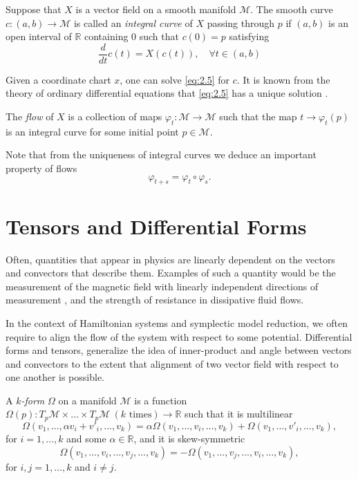 \begin{definition}
Suppose that $X$ is a vector field on a smooth manifold $\mathcal M$. The smooth curve $c:(a,b)\to \mathcal M$ is called an \emph{integral curve} of $X$ passing through $p$ if $(a,b)$ is an open interval of $\mathbb R$ containing $0$ such that  $c(0)=p$ satisfying
\begin{equation} \label{eq:2.5}
	\frac{d}{dt}c(t) = X(c(t)), \quad \forall t\in(a,b) 
\end{equation}
\end{definition}
Given a coordinate chart $x$, one can solve \cref{eq:2.5} for $c$. It is known from the theory of ordinary differential equations that \cref{eq:2.5} has a unique solution \cite{teschl2012ordinary}. 
\begin{definition}
	The \emph{flow} of $X$ is a collection of maps $\varphi_t : \mathcal M \to \mathcal M$ such that the map $t \to \varphi_t(p)$ is an integral curve for some initial point $p\in \mathcal M$.
\end{definition}
Note that from the uniqueness of integral curves we deduce an important property of flows
\begin{equation}
	\varphi_{t+s} = \varphi_t \circ \varphi_s.
\end{equation}

\section{Tensors and Differential Forms}
Often, quantities that appear in physics are linearly dependent on the vectors and convectors that describe them. Examples of such a quantity would be the measurement of the magnetic field with linearly independent directions of measurement \cite{Wald:106274}, and the strength of resistance in dissipative fluid flows. 

In the context of Hamiltonian systems and symplectic model reduction, we often require to align the flow of the system with respect to some potential. Differential forms and tensors, generalize the idea of inner-product and angle between vectors and convectors to the extent that  alignment of two vector field with respect to one another is possible.

\begin{definition}
A \emph{$k$-form} $\Omega$ on a manifold $\mathcal M$ is a function $\Omega(p): T_p\mathcal M \times \dots \times T_p\mathcal M \ (k \text{ times}) \to \mathbb R$ such that it is multilinear
\[
	\Omega(v_1,\dots,\alpha v_i + v'_i, \dots, v_k) = \alpha \Omega(v_1,\dots,v_i, \dots, v_k) + \Omega(v_1,\dots,v'_i, \dots, v_k),
\]
for $i=1,\dots,k$ and some $\alpha \in \mathbb R$, and it is skew-symmetric
\[
	\Omega(v_1,\dots,v_i,\dots,v_j, \dots, v_k) = - \Omega(v_1,\dots,v_j,\dots,v_i, \dots, v_k),
\]
for $i,j=1,\dots,k$ and $i\neq j$.
\end{definition}

